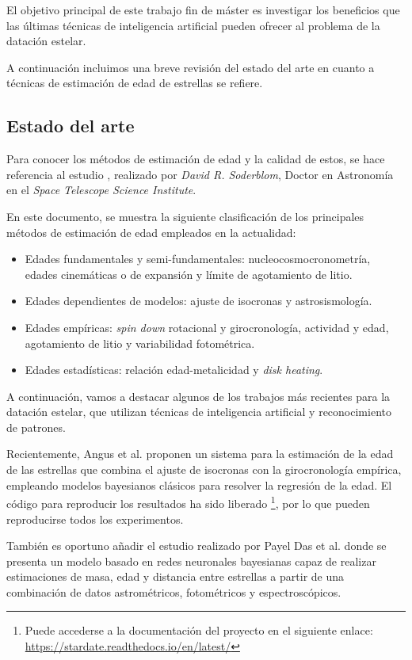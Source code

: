 \documentclass[12pt,oneside,a4paper]{article}
\begin{document}
El objetivo principal de este trabajo fin de máster es investigar los beneficios que las últimas técnicas de inteligencia artificial pueden ofrecer al problema de la datación estelar.

A continuación incluimos una breve revisión del estado del arte en cuanto a técnicas de estimación de edad de estrellas se refiere.

\subsection{Estado del arte}

Para conocer los métodos de estimación de edad y la calidad de estos, se hace referencia al estudio  \cite{Soderblom2010}, realizado por \textit{David R. Soderblom}, Doctor en Astronomía en el \textit{Space Telescope Science Institute}.

En este documento, se muestra la siguiente clasificación de los principales métodos de estimación de edad empleados en la actualidad:
\begin{itemize}
\item Edades fundamentales y semi-fundamentales: nucleocosmocronometría, edades cinemáticas o de expansión y límite de agotamiento de litio.
\item Edades dependientes de modelos: ajuste de isocronas y astrosismología.
\item Edades empíricas: \textit{spin down} rotacional y girocronología, actividad y edad, agotamiento de litio y variabilidad fotométrica.
\item Edades estadísticas: relación edad-metalicidad y \textit{disk heating}.
\end{itemize}

A continuación, vamos a destacar algunos de los trabajos más recientes para la datación estelar, que utilizan técnicas de inteligencia artificial y reconocimiento de patrones.

Recientemente, Angus et al. \cite{Angus2019} proponen un sistema para la estimación de la edad de las estrellas que combina el ajuste de isocronas con la girocronología empírica, empleando modelos bayesianos clásicos para resolver la regresión de la edad. El código para reproducir los resultados ha sido liberado \footnote{Puede accederse a la documentación del proyecto en el siguiente enlace: \url{https://stardate.readthedocs.io/en/latest/}}, por lo que pueden reproducirse todos los experimentos.

También es oportuno añadir el estudio realizado por Payel Das et al. \cite{Das2018} donde se presenta un modelo basado en redes neuronales bayesianas capaz de realizar estimaciones de masa, edad y distancia entre estrellas a partir de una combinación de datos astrométricos, fotométricos y espectroscópicos.
\end{document}
